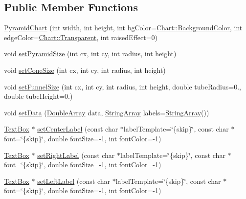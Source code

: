 \subsection*{Public Member Functions}
\begin{DoxyCompactItemize}
\item 
\hyperlink{class_pyramid_chart_a67f11678a7a45f0293f06afd0bdacda5}{Pyramid\+Chart} (int width, int height, int bg\+Color=\hyperlink{namespace_chart_abee0d882fdc9ad0b001245ad9fc64011a134193bde693b9d152d0c6dc59fa7d7f}{Chart\+::\+Background\+Color}, int edge\+Color=\hyperlink{namespace_chart_abee0d882fdc9ad0b001245ad9fc64011afc6811800a9e2582dac0157b6279f836}{Chart\+::\+Transparent}, int raised\+Effect=0)
\item 
void \hyperlink{class_pyramid_chart_ad2e427bdcbcf4a555c9e5143c12f36b1}{set\+Pyramid\+Size} (int cx, int cy, int radius, int height)
\item 
void \hyperlink{class_pyramid_chart_ae46555e161427e9130b7996b38df11a2}{set\+Cone\+Size} (int cx, int cy, int radius, int height)
\item 
void \hyperlink{class_pyramid_chart_a17f068885ee414fc5113ae1063bf0e39}{set\+Funnel\+Size} (int cx, int cy, int radius, int height, double tube\+Radius=0., double tube\+Height=0.)
\item 
void \hyperlink{class_pyramid_chart_aac92f3377d6e2a7241480a16ff775a5d}{set\+Data} (\hyperlink{class_double_array}{Double\+Array} data, \hyperlink{class_string_array}{String\+Array} labels=\hyperlink{class_string_array}{String\+Array}())
\item 
\hyperlink{class_text_box}{Text\+Box} $\ast$ \hyperlink{class_pyramid_chart_a90421ce47f83d9ae8ef001196e0d1712}{set\+Center\+Label} (const char $\ast$label\+Template=\char`\"{}\{skip\}\char`\"{}, const char $\ast$font=\char`\"{}\{skip\}\char`\"{}, double font\+Size=-\/1, int font\+Color=-\/1)
\item 
\hyperlink{class_text_box}{Text\+Box} $\ast$ \hyperlink{class_pyramid_chart_aee77f11172f6c4efa6d9715d43d05193}{set\+Right\+Label} (const char $\ast$label\+Template=\char`\"{}\{skip\}\char`\"{}, const char $\ast$font=\char`\"{}\{skip\}\char`\"{}, double font\+Size=-\/1, int font\+Color=-\/1)
\item 
\hyperlink{class_text_box}{Text\+Box} $\ast$ \hyperlink{class_pyramid_chart_a0ddce92ecb98662bdc6cb7c9538353ee}{set\+Left\+Label} (const char $\ast$label\+Template=\char`\"{}\{skip\}\char`\"{}, const char $\ast$font=\char`\"{}\{skip\}\char`\"{}, double font\+Size=-\/1, int font\+Color=-\/1)

\end{DoxyCompactItemize}
